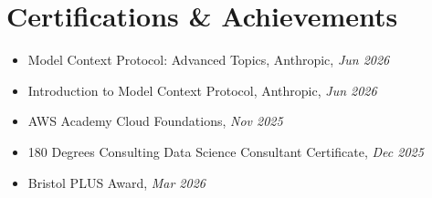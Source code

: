 \documentclass[a4paper,11pt]{article}
\begin{document}
\section{Certifications \& Achievements}
\begin{itemize}
  \item Model Context Protocol: Advanced Topics, Anthropic, \textit{Jun 2026}
  \item Introduction to Model Context Protocol, Anthropic, \textit{Jun 2026}
  \item AWS Academy Cloud Foundations, \textit{Nov 2025}
  \item 180 Degrees Consulting Data Science Consultant Certificate, \textit{Dec 2025}
  \item Bristol PLUS Award, \textit{Mar 2026}
\end{itemize}
\end{document}
